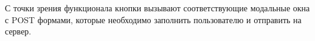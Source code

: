 С точки зрения функционала кнопки вызывают соответствующие модальные окна с POST формами, которые необходимо заполнить
пользователю и отправить на сервер.


























